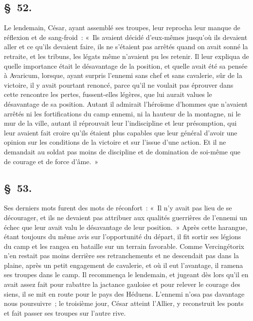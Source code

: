 \documentclass[french,twoside]{book} %
\begin{document}
\subsection[{§ 52.}]{ \textsc{§ 52.} }
\noindent Le lendemain, César, ayant assemblé ses troupes, leur reprocha leur manque de réflexion et de sang-froid : « Ils avaient décidé d’eux-mêmes jusqu’où ils devaient aller et ce qu’ils devaient faire, ils ne s’étaient pas arrêtés quand on avait sonné la retraite, et les tribuns, les légats même n’avaient pu les retenir. Il leur expliqua de quelle importance était le désavantage de la position, et quelle avait été sa pensée à Avaricum, lorsque, ayant surpris l’ennemi sans chef et sans cavalerie, sûr de la victoire, il y avait pourtant renoncé, parce qu’il ne voulait pas éprouver dans cette rencontre les pertes, fussent-elles légères, que lui aurait values le désavantage de sa position. Autant il admirait l’héroïsme d’hommes que n’avaient arrêtés ni les fortifications du camp ennemi, ni la hauteur de la montagne, ni le mur de la ville, autant il réprouvait leur l’indiscipline et leur présomption, qui leur avaient fait croire qu’ils étaient plus capables que leur général d’avoir une opinion sur les conditions de la victoire et sur l’issue d’une action. Et il ne demandait au soldat pas moins de discipline et de domination de soi-même que de courage et de force d’âme. »
\subsection[{§ 53.}]{ \textsc{§ 53.} }
\noindent Ses derniers mots furent des mots de réconfort : « Il n’y avait pas lieu de se décourager, et ils ne devaient pas attribuer aux qualités guerrières de l’ennemi un échec que leur avait valu le désavantage de leur position. » Après cette harangue, étant toujours du même avis sur l’opportunité du départ, il fit sortir ses légions du camp et les rangea en bataille sur un terrain favorable. Comme Vercingétorix n’en restait pas moins derrière ses retranchements et ne descendait pas dans la plaine, après un petit engagement de cavalerie, et où il eut l’avantage, il ramena ses troupes dans le camp. Il recommença le lendemain, et jugeant dès lors qu’il en avait assez fait pour rabattre la jactance gauloise et pour relever le courage des siens, il se mit en route pour le pays des Héduens. L'ennemi n’osa pas davantage nous poursuivre ; le troisième jour, César atteint l’Allier, y reconstruit les ponts et fait passer ses troupes sur l’autre rive.
\end{document}
